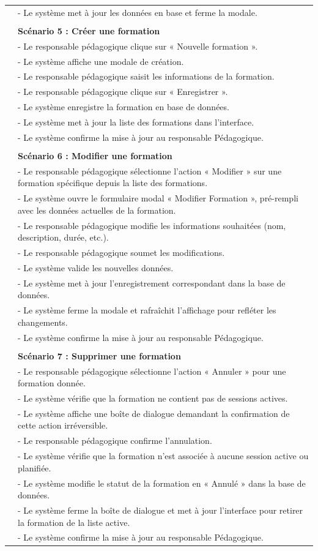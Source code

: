 {\begin{longtable}{|l|p{12cm}|}
\hline
&- Le système met à jour les données en base et ferme la modale. \\
\\
& \textbf{Scénario 5 : Créer une formation} \\
&- Le responsable pédagogique clique sur « Nouvelle formation ». \\
&- Le système affiche une modale de création. \\
&- Le responsable pédagogique saisit les informations de la formation. \\
&- Le responsable pédagogique clique sur « Enregistrer ». \\
&- Le système enregistre la formation en base de données. \\
&- Le système met à jour la liste des formations dans l'interface. \\
&- Le système confirme la mise à jour au responsable Pédagogique.\\
\\
& \textbf{Scénario 6 : Modifier une formation} \\
&- Le responsable pédagogique sélectionne l'action « Modifier » sur une formation spécifique depuis la liste des formations. \\
&- Le système ouvre le formulaire modal « Modifier Formation », pré-rempli avec les données actuelles de la formation. \\
&- Le responsable pédagogique modifie les informations souhaitées (nom, description, durée, etc.). \\
&- Le responsable pédagogique soumet les modifications. \\
&- Le système valide les nouvelles données. \\
&- Le système met à jour l'enregistrement correspondant dans la base de données. \\
&- Le système ferme la modale et rafraîchit l'affichage pour refléter les changements. \\
&- Le système confirme la mise à jour au responsable Pédagogique.\\
\\
& \textbf{Scénario 7 : Supprimer une formation} \\
&- Le responsable pédagogique sélectionne l'action « Annuler » pour une formation donnée. \\
&- Le système vérifie que la formation ne contient pas de sessions actives. \\
&- Le système affiche une boîte de dialogue demandant la confirmation de cette action irréversible. \\
&- Le responsable pédagogique confirme l'annulation. \\
&- Le système vérifie que la formation n'est associée à aucune session active ou planifiée. \\
&- Le système modifie le statut de la formation en « Annulé » dans la base de données. \\
&- Le système ferme la boîte de dialogue et met à jour l'interface pour retirer la formation de la liste active. \\
&- Le système confirme la mise à jour au responsable Pédagogique.\\
\hline


\end{longtable}}
